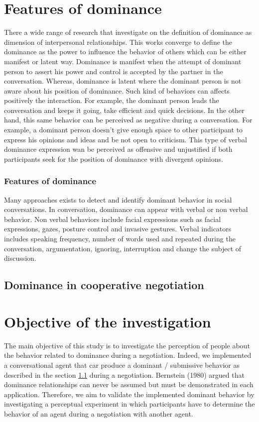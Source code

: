 \documentclass{llncs}
\begin{document}
\section{Features of dominance}
There a wide range of research that investigate on the definition of dominance as dimension of interpersonal relationships. This works converge to define the dominance as the power to influence the behavior of others which can be either manifest or latent way. Dominance is manifest when the attempt of dominant person to assert his power and control is accepted by the partner in the conversation. Whereas, dominance is latent where the dominant person is not aware about his position of dominance. Such kind of behaviors can affects positively the interaction. For example, the dominant person leads the conversation and keeps it going,  take efficient and quick decisions. In the other hand, this same behavior can be perceived as negative during a conversation. For example, a dominant person doesn't give enough space to other participant to express his opinions and ideas and be not open to criticism. This type of verbal dominance expression wan be perceived as offensive and unjustified if both participants seek for the position of dominance with divergent opinions. 

\subsubsection{Features of dominance}
Many approaches exists to detect and identify dominant behavior in social conversations. In conversation, dominance can appear with verbal or non verbal behavior. Non verbal behaviors include facial expressions such as facial expressions, gazes, posture control and invasive gestures.  Verbal indicators includes speaking frequency, number of words used and repeated during the conversation, argumentation, ignoring, interruption and change the subject of discussion.     

\subsection{Dominance in cooperative negotiation}
\label{DN}

\section{Objective of the investigation}

The main objective of this study is to investigate the perception of people about the behavior related to dominance during a negotiation. Indeed, we implemented a conversational agent that car produce a dominant / submissive behavior as described in the section \ref{DN} during a negotiation. Bernstein (1980) argued that dominance relationships can never be assumed but must be demonstrated in each application. Therefore, we aim to validate the implemented dominant behavior by investigating a perceptual experiment in which participants have to determine the behavior of an agent during a negotiation with another agent. 
\end{document}

